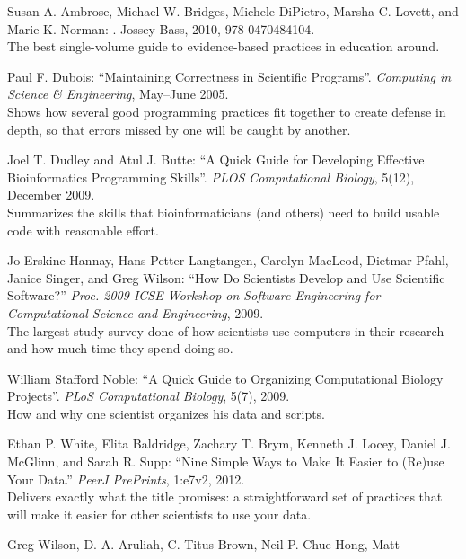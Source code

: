 \documentclass{book}
\begin{document}
\begin{swcitemize}
\item
  Susan A. Ambrose, Michael W. Bridges, Michele DiPietro, Marsha C.
  Lovett, and Marie K. Norman:
  \emph{}.
  Jossey-Bass, 2010, 978-0470484104. \\ The best single-volume guide to
  evidence-based practices in education around.
\item
  Paul F. Dubois: ``Maintaining Correctness in Scientific Programs''.
  \emph{Computing in Science \& Engineering}, May--June 2005. \\ Shows
  how several good programming practices fit together to create defense
  in depth, so that errors missed by one will be caught by another.
\item
  Joel T. Dudley and Atul J. Butte: ``A Quick Guide for Developing
  Effective Bioinformatics Programming Skills''. \emph{PLOS
  Computational Biology}, 5(12), December 2009. \\ Summarizes the skills
  that bioinformaticians (and others) need to build usable code with
  reasonable effort.
\item
  Jo Erskine Hannay, Hans Petter Langtangen, Carolyn MacLeod, Dietmar
  Pfahl, Janice Singer, and Greg Wilson: ``How Do Scientists Develop and
  Use Scientific Software?'' \emph{Proc. 2009 ICSE Workshop on Software
  Engineering for Computational Science and Engineering}, 2009. \\ The
  largest study survey done of how scientists use computers in their
  research and how much time they spend doing so.
\item
  William Stafford Noble: ``A Quick Guide to Organizing Computational
  Biology Projects''. \emph{PLoS Computational Biology}, 5(7), 2009. \\
  How and why one scientist organizes his data and scripts.
\item
  Ethan P. White, Elita Baldridge, Zachary T. Brym, Kenneth J. Locey,
  Daniel J. McGlinn, and Sarah R. Supp: ``Nine Simple Ways to Make It
  Easier to (Re)use Your Data.'' \emph{PeerJ PrePrints}, 1:e7v2, 2012.
  \\ Delivers exactly what the title promises: a straightforward set of
  practices that will make it easier for other scientists to use your
  data.
\item
  Greg Wilson, D. A. Aruliah, C. Titus Brown, Neil P. Chue Hong, Matt

\end{swcitemize}
\end{document}
